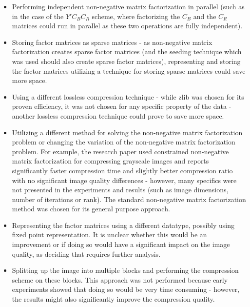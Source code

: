 \documentclass[thesis=M,english]{FITthesis}[2012/10/20]
\begin{document}
\begin{itemize}
  \item Performing independent non-negative matrix factorization in parallel
  (such as in the case of the $Y'C_BC_R$ scheme, where factorizing the $C_B$
  and the $C_R$ matrices could run in parallel as these two operations are
  fully independent).
  \item Storing factor matrices as sparse matrices - as non-negative matrix
  factorization creates sparse factor matrices (and the seeding technique
  which was used should also create sparse factor matrices), representing
  and storing the factor matrices utilizing a technique for storing sparse
  matrices could save more space.
  \item Using a different lossless compression technique - while zlib was
  chosen for its proven efficiency, it was not chosen for any specific property
  of the data - another lossless compression technique could prove to save
  more space.
  \item Utilizing a different method for solving the non-negative matrix factorization
  problem or changing the variation of the non-negative matrix factorization problem.
  For example, the research paper \cite{imgcnmf} used constrained non-negative matrix factorization for
  compressing grayscale images and reports significantly faster compression time and slightly
  better compression ratio with no significant image quality differences - however, many specifics
  were not presented in the experiments and results (such as image dimensions, number
  of iterations or rank). The standard non-negative matrix factorization method was
  chosen for its general purpose approach.
  \item Representing the factor matrices using a different datatype, possibly using fixed point
  representation. It is unclear whether this would be an improvement or if doing so would
  have a significant impact on the image quality, as deciding that requires further analysis.
  \item Splitting up the image into multiple blocks and performing the compression scheme on these
  blocks. This approach was not performed because early experiments showed that doing so would be very
  time consuming - however, the results might also significantly improve the compression quality.
\end{itemize}
\end{document}
